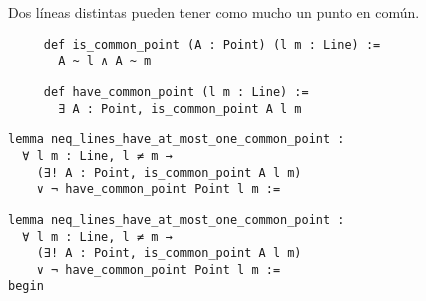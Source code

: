 \begin{frame}[fragile]
	\begin{prop}
		Dos líneas distintas pueden tener como mucho un punto en común.
	\end{prop}
	\vspace{1em}
	\pause
	\begin{lstlisting}
     def is_common_point (A : Point) (l m : Line) := 
       A ~ l ∧ A ~ m 
	\end{lstlisting}
	\begin{lstlisting}
     def have_common_point (l m : Line) := 
       ∃ A : Point, is_common_point A l m
	\end{lstlisting}
\end{frame}










\begin{frame}[fragile]
	\begin{multicols}{2}
		\begin{lstlisting}
lemma neq_lines_have_at_most_one_common_point :
  ∀ l m : Line, l ≠ m → 
    (∃! A : Point, is_common_point A l m) 
    ∨ ¬ have_common_point Point l m := 
\end{lstlisting}
		\columnbreak
		\hfill
	\end{multicols}
\end{frame}










\begin{frame}[fragile]
	\begin{multicols}{2}
		\begin{lstlisting}
lemma neq_lines_have_at_most_one_common_point :
  ∀ l m : Line, l ≠ m → 
    (∃! A : Point, is_common_point A l m) 
    ∨ ¬ have_common_point Point l m := 
begin
\end{lstlisting}
		\columnbreak
		\begin{lstlisting}

		\end{lstlisting}
	\end{multicols}
\end{frame}










